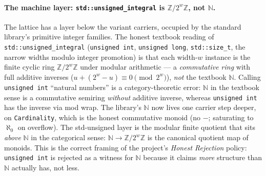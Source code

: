 \documentclass[11pt, a4paper]{report}
\begin{document}
\paragraph{The machine layer: \texttt{std::unsigned\_integral} is $\mathbb{Z}/2^w\mathbb{Z}$, not $\mathbb{N}$.} The lattice has a layer below the variant carriers, occupied by the standard library's primitive integer families. The honest textbook reading of \texttt{std::unsigned\_integral} (\texttt{unsigned int}, \texttt{unsigned long}, \texttt{std::size\_t}, the narrow widths modulo integer promotion) is that each width-$w$ instance is the finite cyclic ring $\mathbb{Z}/2^w\mathbb{Z}$ under modular arithmetic --- a \emph{commutative ring} with full additive inverses ($u + (2^w - u) \equiv 0 \pmod{2^w}$), \emph{not} the textbook $\mathbb{N}$. Calling \texttt{unsigned int} ``natural numbers'' is a category-theoretic error: $\mathbb{N}$ in the textbook sense is a commutative semiring \emph{without} additive inverse, whereas \texttt{unsigned int} has the inverse via mod wrap. The library's $\mathbb{N}$ now lives one carrier step deeper, on \texttt{Cardinality}, which is the honest commutative monoid (no $-$; saturating to $\aleph_0$ on overflow). The std-unsigned layer is the modular finite quotient that sits \emph{above} $\mathbb{N}$ in the categorical sense: $\mathbb{N} \to \mathbb{Z}/2^w\mathbb{Z}$ is the canonical quotient map of monoids. This is the correct framing of the project's \emph{Honest Rejection} policy: \texttt{unsigned int} is rejected as a witness for $\mathbb{N}$ because it claims \emph{more} structure than $\mathbb{N}$ actually has, not less.
\end{document}
